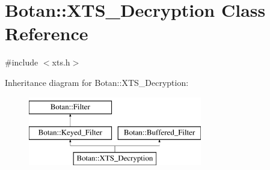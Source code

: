 \hypertarget{classBotan_1_1XTS__Decryption}{\section{Botan\-:\-:X\-T\-S\-\_\-\-Decryption Class Reference}
\label{classBotan_1_1XTS__Decryption}
}


{\ttfamily \#include $<$xts.\-h$>$}

Inheritance diagram for Botan\-:\-:X\-T\-S\-\_\-\-Decryption\-:\begin{figure}[H]
\begin{center}
\leavevmode
\includegraphics[height=3.000000cm]{classBotan_1_1XTS__Decryption}
\end{center}
\end{figure}
